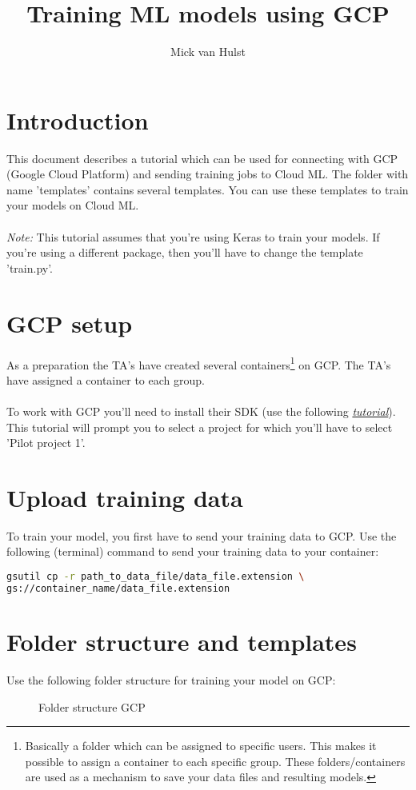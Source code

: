 \documentclass{article}
\title{Training ML models using GCP}
\author{Mick van Hulst}
\begin{document}
\maketitle

\section{Introduction}
This document describes a tutorial which can be used for connecting with GCP (Google Cloud Platform) and sending training jobs to Cloud ML. The folder with name 'templates' contains several templates. You can use these templates to train your models on Cloud ML. 
\\
\\
\textit{Note: }This tutorial assumes that you're using Keras to train your models. If you're using a different package, then you'll have to change the template 'train.py'.

\section{GCP setup}
As a preparation the TA's have created several containers\footnote{Basically a folder which can be assigned to specific users. This makes it possible to assign a container to each specific group. These folders/containers are used as a mechanism to save your data files and resulting models.} on GCP. The TA's have assigned a container to each group.
\\
\\
To work with GCP you'll need to install their SDK (use the following \hyperlink{https://cloud.google.com/sdk/docs/}{\textit{tutorial}}). This tutorial will prompt you to select a project for which you'll have to select 'Pilot project 1'.

\section{Upload training data}
To train your model, you first have to send your training data to GCP. Use the following (terminal) command to send your training data to your container:

\begin{lstlisting}[language=Bash]
gsutil cp -r path_to_data_file/data_file.extension \
gs://container_name/data_file.extension
\end{lstlisting}

\pagebreak

\section{Folder structure and templates}
Use the following folder structure for training your model on GCP:
\begin{figure}[H]
\caption{Folder structure GCP}
\label{fig:fsgcp}
\end{figure}
\end{document}
